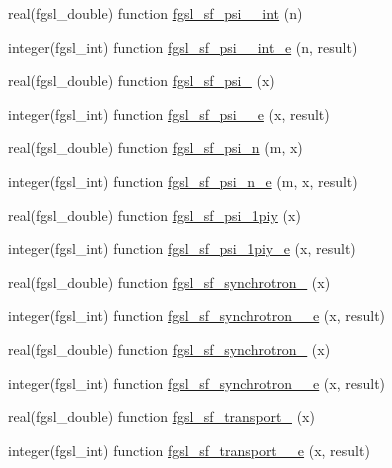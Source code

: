 \begin{DoxyCompactItemize}
\item 
real(fgsl\-\_\-double) function \hyperlink{specfunc_8finc_afc36a0cecadb24ae6cf4fa19d8e648e1}{fgsl\-\_\-sf\-\_\-psi\-\_\-\_\-int} (n)
\item 
integer(fgsl\-\_\-int) function \hyperlink{specfunc_8finc_a5dc442d40bcd780c8796587f326ad84a}{fgsl\-\_\-sf\-\_\-psi\-\_\-\_\-int\-\_\-e} (n, result)
\item 
real(fgsl\-\_\-double) function \hyperlink{specfunc_8finc_aec74f69cd3f70ff1b47f8c936a0d2d52}{fgsl\-\_\-sf\-\_\-psi\-\_} (x)
\item 
integer(fgsl\-\_\-int) function \hyperlink{specfunc_8finc_a80fe4950516eda1ff1e15fb928cc29d6}{fgsl\-\_\-sf\-\_\-psi\-\_\-\_\-e} (x, result)
\item 
real(fgsl\-\_\-double) function \hyperlink{specfunc_8finc_a80562cfacb64fb925a3c7ce5ec91d7c4}{fgsl\-\_\-sf\-\_\-psi\-\_\-n} (m, x)
\item 
integer(fgsl\-\_\-int) function \hyperlink{specfunc_8finc_a3ddb539ba9d0c948be7666ac805f333c}{fgsl\-\_\-sf\-\_\-psi\-\_\-n\-\_\-e} (m, x, result)
\item 
real(fgsl\-\_\-double) function \hyperlink{specfunc_8finc_a55d5470345e74e337247c83d906ce14e}{fgsl\-\_\-sf\-\_\-psi\-\_\-1piy} (x)
\item 
integer(fgsl\-\_\-int) function \hyperlink{specfunc_8finc_a16d5deef40eaf1313ebe52a074b60b73}{fgsl\-\_\-sf\-\_\-psi\-\_\-1piy\-\_\-e} (x, result)
\item 
real(fgsl\-\_\-double) function \hyperlink{specfunc_8finc_a34fa10e4dcc187cb900f253714e6c29c}{fgsl\-\_\-sf\-\_\-synchrotron\-\_} (x)
\item 
integer(fgsl\-\_\-int) function \hyperlink{specfunc_8finc_adc7ff5b8886e060fb8dbb58f517dc7fa}{fgsl\-\_\-sf\-\_\-synchrotron\-\_\-\_\-e} (x, result)
\item 
real(fgsl\-\_\-double) function \hyperlink{specfunc_8finc_afbf1c93cb6fb629046d5228ab93cba8d}{fgsl\-\_\-sf\-\_\-synchrotron\-\_} (x)
\item 
integer(fgsl\-\_\-int) function \hyperlink{specfunc_8finc_a66807d05fcd1f327597dc10126dac061}{fgsl\-\_\-sf\-\_\-synchrotron\-\_\-\_\-e} (x, result)
\item 
real(fgsl\-\_\-double) function \hyperlink{specfunc_8finc_a08185c256797e453e453f095259a6f1d}{fgsl\-\_\-sf\-\_\-transport\-\_} (x)
\item 
integer(fgsl\-\_\-int) function \hyperlink{specfunc_8finc_aa0d7b42b274ec2614c0d055f95fa815c}{fgsl\-\_\-sf\-\_\-transport\-\_\-\_\-e} (x, result)

\end{DoxyCompactItemize}
